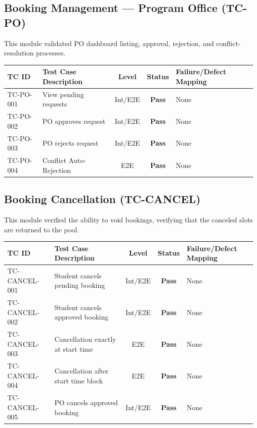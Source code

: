 \documentclass[11pt,a4paper]{article}
\begin{document}
\subsection{Booking Management — Program Office (TC-PO)}
This module validated PO dashboard listing, approval, rejection, and conflict-resolution processes.
\begin{center}
\begin{longtable}{llccp{5.5cm}}
\toprule
\textbf{TC ID} & \textbf{Test Case Description} & \textbf{Level} & \textbf{Status} & \textbf{Failure/Defect Mapping} \\ \midrule
TC-PO-001 & View pending requests & Int/E2E & \color{passgreenfg}\textbf{Pass} & None \\
TC-PO-002 & PO approves request & Int/E2E & \color{passgreenfg}\textbf{Pass} & None \\
TC-PO-003 & PO rejects request & Int/E2E & \color{passgreenfg}\textbf{Pass} & None \\
TC-PO-004 & Conflict Auto-Rejection & E2E & \color{passgreenfg}\textbf{Pass} & None \\
\bottomrule
\end{longtable}
\end{center}

\newpage
\subsection{Booking Cancellation (TC-CANCEL)}
This module verified the ability to void bookings, verifying that the canceled slots are returned to the pool.
\begin{center}
\begin{longtable}{llccp{5.5cm}}
\toprule
\textbf{TC ID} & \textbf{Test Case Description} & \textbf{Level} & \textbf{Status} & \textbf{Failure/Defect Mapping} \\ \midrule
TC-CANCEL-001 & Student cancels pending booking & Int/E2E & \color{passgreenfg}\textbf{Pass} & None \\
TC-CANCEL-002 & Student cancels approved booking & Int/E2E & \color{passgreenfg}\textbf{Pass} & None \\
TC-CANCEL-003 & Cancellation exactly at start time & E2E & \color{passgreenfg}\textbf{Pass} & None \\
TC-CANCEL-004 & Cancellation after start time block & E2E & \color{passgreenfg}\textbf{Pass} & None \\
TC-CANCEL-005 & PO cancels approved booking & Int/E2E & \color{passgreenfg}\textbf{Pass} & None \\
\bottomrule
\end{longtable}
\end{center}
\end{document}
